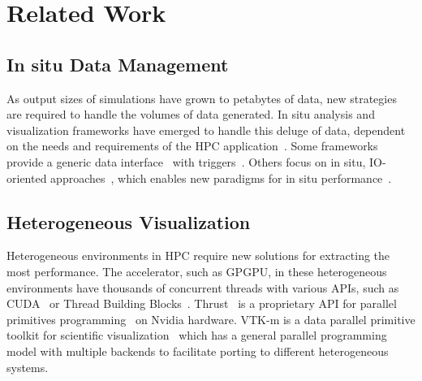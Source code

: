 \section{Related Work}
\subsection{In situ Data Management}
As output sizes of simulations have grown to petabytes of data, new strategies are required to handle the volumes of data generated. In situ analysis and visualization frameworks have emerged to handle this deluge of data, dependent on the needs and requirements of the HPC application~\cite{Abbasi2010, Ayachit:2015:PCE:2828612.2828624,Childs:VisIt-HPV-Chapter:2012, 6846460}. Some frameworks provide a generic data interface~\cite{Ayachit:2016:SGS:3018859.3018867,Larsen:2017:ASI:3144769.3144778} with triggers~\cite{Larsen:2018:FSS:3281464.3281468}. Others focus on in situ, IO-oriented approaches~\cite{doi:10.1002/cpe.3125}, which enables new paradigms for in situ performance~\cite{Kress:ISC19}.

\subsection{Heterogeneous Visualization}
Heterogeneous environments in HPC require new solutions for extracting the most performance. The accelerator, such as GPGPU, in these heterogeneous environments have thousands of concurrent threads with various APIs, such as CUDA~\cite{CUDA} or Thread Building Blocks~\cite{books:daglib:0018624}. Thrust~\cite{hoberock2009thrust} is a proprietary API for parallel primitives programming~\cite{Blelloch:1990:VMD:91254} on Nvidia hardware. VTK-m is a data parallel primitive toolkit for scientific visualization~\cite{vtkm} which has a general parallel programming model with multiple backends to facilitate porting to different heterogeneous systems. 

